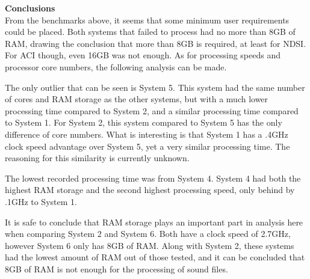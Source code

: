 \noindent\textbf{Conclusions}\\
From the benchmarks above, it seems that some minimum user requirements could be placed. Both systems that failed to process had no more than 8GB of RAM, drawing the conclusion that more than 8GB is required, at least for NDSI. For ACI though, even 16GB was not enough. As for processing speeds and processor core numbers, the following analysis can be made.\par
The only outlier that can be seen is System 5. This system had the same number of cores and RAM storage as the other systems, but with a much lower processing time compared to System 2, and a similar processing time compared to System 1. For System 2, this system compared to System 5 has the only difference of core numbers. What is interesting is that System 1 has a .4GHz clock speed advantage over System 5, yet a very similar processing time. The reasoning for this similarity is currently unknown.\par
The lowest recorded processing time was from System 4. System 4 had both the highest RAM storage and the second highest processing speed, only behind by .1GHz to System 1.\par
It is safe to conclude that RAM storage plays an important part in analysis here when comparing System 2 and System 6. Both have a clock speed of 2.7GHz, however System 6 only has 8GB of RAM. Along with System 2, these systems had the lowest amount of RAM out of those tested, and it can be concluded that 8GB of RAM is not enough for the processing of sound files.\par
